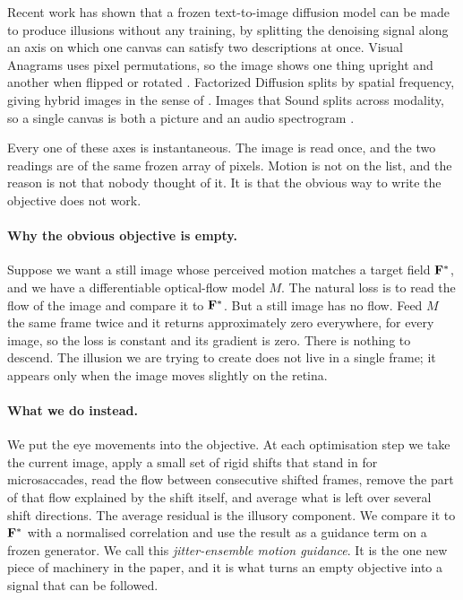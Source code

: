 Recent work has shown that a frozen text-to-image diffusion model can be made
to produce illusions without any training, by splitting the denoising signal
along an axis on which one canvas can satisfy two descriptions at once. Visual
Anagrams uses pixel permutations, so the image shows one thing upright and
another when flipped or rotated \cite{geng2024anagrams}. Factorized Diffusion
splits by spatial frequency, giving hybrid images in the sense of
\citet{oliva2006hybrid} \cite{geng2024factorized}. Images that Sound splits
across modality, so a single canvas is both a picture and an audio spectrogram
\cite{chen2024imagesthatsound}.

Every one of these axes is instantaneous. The image is read once, and the two
readings are of the same frozen array of pixels. Motion is not on the list, and
the reason is not that nobody thought of it. It is that the obvious way to
write the objective does not work.

\paragraph{Why the obvious objective is empty.}
Suppose we want a still image whose perceived motion matches a target field
$\mathbf{F}^\ast$, and we have a differentiable optical-flow model $M$. The natural
loss is to read the flow of the image and compare it to $\mathbf{F}^\ast$. But a still
image has no flow. Feed $M$ the same frame twice and it returns approximately
zero everywhere, for every image, so the loss is constant and its gradient is
zero. There is nothing to descend. The illusion we are trying to create does
not live in a single frame; it appears only when the image moves slightly on
the retina.

\paragraph{What we do instead.}
We put the eye movements into the objective. At each optimisation step we take
the current image, apply a small set of rigid shifts that stand in for
microsaccades, read the flow between consecutive shifted frames, remove the
part of that flow explained by the shift itself, and average what is left over
several shift directions. The average residual is the illusory component. We
compare it to $\mathbf{F}^\ast$ with a normalised correlation and use the result as a
guidance term on a frozen generator. We call this \emph{jitter-ensemble motion
guidance}. It is the one new piece of machinery in the paper, and it is what
turns an empty objective into a signal that can be followed.

